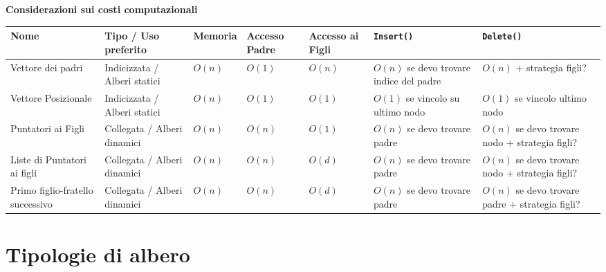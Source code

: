 \documentclass{article}
\begin{document}
\vspace{0.3cm}
\begin{table}[htbp]
\centering
\Large \textbf{Considerazioni sui costi computazionali} \\[1.2em]
\normalsize
\renewcommand{\arraystretch}{1.5}

\begin{tabular}{|
  >{\centering\arraybackslash}m{2.3cm}|
  >{\centering\arraybackslash}m{2.5cm}|
  >{\centering\arraybackslash}m{1.5cm}|
  >{\centering\arraybackslash}m{1.5cm}|
  >{\centering\arraybackslash}m{1.5cm}|
  >{\centering\arraybackslash}m{3.0cm}|
  >{\centering\arraybackslash}m{3.2cm}|
}
\hline
\textbf{Nome} & \textbf{Tipo / Uso preferito} & \textbf{Memoria} & \textbf{Accesso Padre} & \textbf{Accesso ai Figli} & \textbf{\texttt{Insert()}} & \textbf{\texttt{Delete()}} \\ \hline

Vettore dei padri & Indicizzata / Alberi statici & $O(n)$ & $O(1)$ & $O(n)$ & $O(n)$ se devo trovare indice del padre & $O(n)$ + strategia figli? \\ \hline

Vettore Posizionale & Indicizzata / Alberi statici & $O(n)$ & $O(1)$ & $O(1)$ & $O(1)$ se vincolo su ultimo nodo & $O(1)$ se vincolo ultimo nodo \\ \hline

Puntatori ai Figli & Collegata / Alberi dinamici & $O(n)$ & $O(n)$ & $O(1)$ & $O(n)$ se devo trovare padre & $O(n)$ se devo trovare nodo + strategia figli? \\ \hline

Liste di Puntatori ai figli & Collegata / Alberi dinamici & $O(n)$ & $O(n)$ & $O(d)$ & $O(n)$ se devo trovare padre & $O(n)$ se devo trovare nodo + strategia figli? \\ \hline

Primo figlio-fratello successivo & Collegata / Alberi dinamici & $O(n)$ & $O(n)$ & $O(d)$ & $O(n)$ se devo trovare padre & $O(n)$ se devo trovare padre + strategia figli? \\ \hline

\end{tabular}
\end{table}

\section*{Tipologie di albero}
\end{document}
